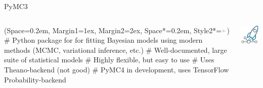 \documentclass[12pt, aspectratio=149]{beamer}
\newcommand{\listSpace}{0.2em}
\theoremstyle{plain}
\begin{document}
\begin{frame}[fragile]{PyMC3}
	\begin{columns}
		\begin{column}{0.7\linewidth}
			\begin{easylist}
				\ListProperties(Space=\listSpace, Margin1=1ex, Margin2=2ex, Space*=\listSpace, Style2*=$\color{bggraydark}\blacktriangleright$\space)
				# Python package for for fitting Bayesian models using modern methods (MCMC, variational inference, etc.)
				# Well-documented, large suite of statistical models
				# Highly flexible, but easy to use
				# Uses Theano-backend (not good)
				# PyMC4 in development, uses TensorFlow Probability-backend
			\end{easylist}
		\end{column}
		\begin{column}{0.3\textwidth}
			\includegraphics[width=\textwidth]{figs/pymc3.png}
		\end{column}
	\end{columns}
\end{frame}
\end{document}
